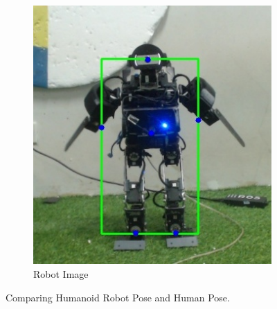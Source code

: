 \begin{figure}
\begin{subfigure}[b]{0.4\textwidth}
      \includegraphics[width=\textwidth]{gambar/robot_6_result.jpg}
      \caption{Robot Image}
      \label{fig:robotimageb}
  \end{subfigure}
     \caption{Comparing Humanoid Robot Pose and Human Pose.}
     \label{fig:comparingb}
\end{figure}